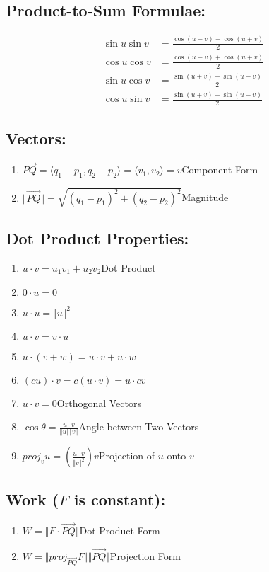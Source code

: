 \documentclass{amsart}
\begin{document}
\begin{multicols}{2}
    \subsection*{Product-to-Sum Formulae:}
    \begin{align*}
    \sin u\sin v&=\frac{\cos(u-v)-\cos(u+v)}{2}\\
    \cos u\cos v&=\frac{\cos(u-v)+\cos(u+v)}{2}\\
    \sin u\cos v&=\frac{\sin(u+v)+\sin(u-v)}{2}\\
    \cos u\sin v&=\frac{\sin(u+v)-\sin(u-v)}{2}
    \end{align*}
    \subsection*{Vectors:}
    \begin{enumerate}
        \item $\overrightarrow{PQ}=\langle q_1-p_1,q_2-p_2\rangle=\langle v_1,v_2\rangle=v$\hfill Component Form
        \item $\Vert\overrightarrow{PQ}\Vert=\sqrt{(q_1-p_1)^2+(q_2-p_2)^2}$\hfill Magnitude
    \end{enumerate}
    \subsection*{Dot Product Properties:}
    \begin{enumerate}
        \item $u\cdot v=u_1v_1+u_2v_2$\hfill Dot Product
        \item $0\cdot u=0$
        \item $u\cdot u=\Vert u\Vert^2$
        \item $u\cdot v=v\cdot u$
        \item $u\cdot (v+w)=u\cdot v+u\cdot w$
        \item $(cu)\cdot v=c(u\cdot v)=u\cdot cv$
        \item $u\cdot v=0$\hfill Orthogonal Vectors
        \item $\cos\theta = \frac{u\cdot v}{\Vert u\Vert\Vert v\Vert}$\hfill Angle between Two Vectors
        \item $proj_vu=\left(\frac{u\cdot v}{\Vert v\Vert^2}\right)v$\hfill Projection of $u$ onto $v$
    \end{enumerate}
    \subsection*{ Work ($F$ is constant):}
    \begin{enumerate}
        \item $W=\Vert F\cdot\overrightarrow{PQ}\Vert$\hfill Dot Product Form
        \item $W=\Vert proj_{\overrightarrow{PQ}}F\Vert\Vert\overrightarrow{PQ}\Vert$\hfill Projection Form
    \end{enumerate}

\end{multicols}
\end{document}
